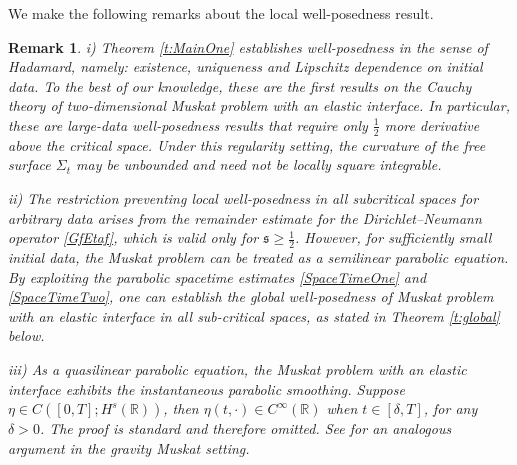\documentclass[12pt]{amsart}
\newtheorem{remark}{Remark}[section]
\theoremstyle{definition}
\numberwithin{equation}{section}
\newcommand{\R}{\mathbb{R}}
\newcommand{\f}{\frac}
\begin{document}
We make the following remarks about the local well-posedness result.
\begin{remark}
i) Theorem \ref{t:MainOne} establishes well-posedness in the sense of Hadamard, namely: existence, uniqueness and Lipschitz dependence on initial data.
To the best of our knowledge, these are the first results on the Cauchy theory of two-dimensional Muskat problem with an elastic interface.
In particular, these are large-data well-posedness results that require only $\f12$ more derivative above the critical space.
Under this regularity setting, the curvature of the free surface $\Sigma_t$ may be unbounded and need not be locally square integrable.

ii) The restriction preventing local well-posedness in all subcritical spaces for arbitrary data arises from the remainder estimate for the Dirichlet–Neumann operator \eqref{GfEtaf}, which is valid only for $\mathfrak{s} \geq \f12$.
However, for sufficiently small initial data, the Muskat problem can be treated as a semilinear parabolic equation.
By exploiting the parabolic spacetime estimates \eqref{SpaceTimeOne} and \eqref{SpaceTimeTwo}, one can establish the global well-posedness of Muskat problem with an elastic interface in all sub-critical spaces, as stated in Theorem \ref{t:global} below. 

iii) As a quasilinear parabolic equation, the Muskat problem with an elastic interface exhibits the instantaneous parabolic smoothing.
Suppose $\eta \in C([0,T]; H^s(\R))$, then $\eta(t, \cdot) \in C^\infty(\R)$ when $t\in [\delta, T]$, for any $\delta>0$.
The proof is standard and therefore omitted. 
See \cite[Section 9]{MR3415681} for an analogous argument in the gravity Muskat setting.

\end{remark}
\end{document}
